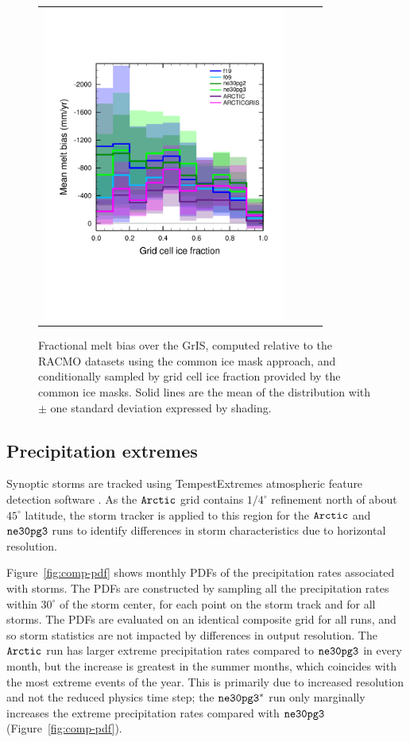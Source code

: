 \documentclass[draft]{agujournal2019}
\begin{document}
\begin{figure}[t]
\begin{center}
\begin{tabular}{cccc}
         \includegraphics[width=80mm]{figs/temp_xy_diffRACMO_melt.pdf}
\end{tabular}
\end{center}
\caption{Fractional melt bias over the GrIS, computed relative to the RACMO datasets using the common ice mask approach, and conditionally sampled by grid cell ice fraction provided by the common ice masks. Solid lines are the mean of the distribution with $\pm$ one standard deviation expressed by shading.}
\label{fig:bias}
\end{figure}

\subsection{Precipitation extremes}

Synoptic storms are tracked using TempestExtremes atmospheric feature detection software \cite{UETAL2021}. As the $\tt Arctic$ grid contains $1/4^{\circ}$ refinement north of about $45^{\circ}$ latitude, the storm tracker is applied to this region for the $\tt Arctic$ and $\tt ne30pg3$ runs to identify differences in storm characteristics due to horizontal resolution.

Figure~\ref{fig:comp-pdf} shows monthly PDFs of the precipitation rates associated with storms. The PDFs are constructed by sampling all the precipitation rates within $30^{\circ}$ of the storm center, for each point on the storm track and for all storms. The PDFs are evaluated on an identical composite grid for all runs, and so storm statistics are not impacted by differences in output resolution. The $\tt Arctic$ run has larger extreme precipitation rates compared to $\tt ne30pg3$ in every month, but the increase is greatest in the summer months, which coincides with the most extreme events of the year. This is primarily due to increased resolution and not the reduced physics time step; the $\tt ne30pg3^{*}$ run only marginally increases the extreme precipitation rates compared with $\tt ne30pg3$ (Figure~\ref{fig:comp-pdf}).
\end{document}
